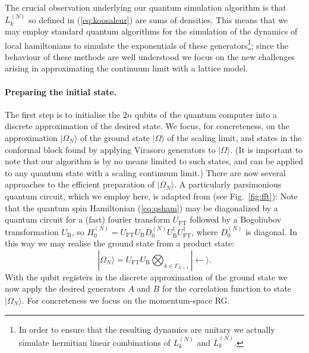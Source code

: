 \documentclass[12pt]{article}
\newcommand{\1}{\mathds{1}}
\begin{document}
The crucial observation underlying our quantum simulation algorithm is that $L_k^{(N)}$ so defined in (\ref{eq:koosaleur}) are sums of densities. This means that we may employ standard quantum algorithms for the simulation of the dynamics of local hamiltonians to simulate the exponentials of these generators\footnote{In order to ensure that the resulting dynamics are unitary we actually simulate hermitian linear combinations of $L_k^{(N)}$ and $\overline{L}_k^{(N)}$.}; since the behaviour of these methods are well understood we focus on the new challenges arising in approximating the continuum limit with a lattice model.

\paragraph*{Preparing the initial state.} The first step is to initialise the $2n$ qubits of the quantum computer into a discrete approximation of the desired state. We focus, for concreteness, on the approximation $|\Omega_N\rangle$ of the ground state $|\Omega\rangle$ of the scaling limit, and states in the conformal block found by applying Virasoro generators to $|\Omega\rangle$. (It is important to note that our algorithm is by no means limited to such states, and can be applied to any quantum state with a scaling continuum limit.) There are now several approaches to the efficient preparation of $|\Omega_N\rangle$. A particularly parsimonious quantum circuit, which we employ here, is adapted from \cite{verstraeteQuantumCircuitsStrongly2009} (see Fig.~\ref{fig:fft}): Note that the quantum spin Hamiltonian (\ref{eq:qsham}) may be diagonalized by a quantum circuit for a (fast) fourier transform $U_{\text{FT}}$ followed by a Bogoliubov transformation $U_{\text{B}}$, so $H_0^{(N)} = U_{\text{FT}}U_{\text{B}} D^{(N)}_0 U_{\text{B}}^\dag U_{\text{FT}}^\dag$, where $D^{(N)}_0$ is diagonal. In this way we may realise the ground state from a product state:
\begin{equation}
	|\Omega_N\rangle = U_{\text{FT}}U_{\text{B}} \bigotimes_{k\in \Gamma_{N+1}} |\!\leftarrow\rangle.
\end{equation}
With the qubit registers in the discrete approximation of the ground state we now apply the desired generators $A$ and $B$ for the correlation function to state $|\Omega_N\rangle$. For concreteness we focus on the momentum-space RG.
\end{document}

